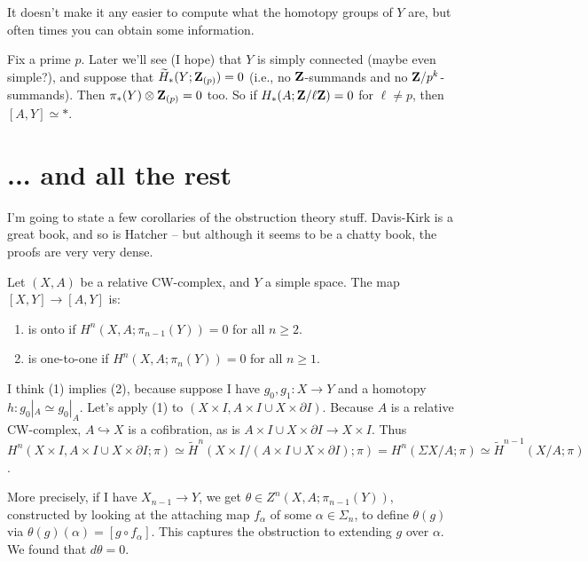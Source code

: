It doesn't make it any easier to compute what the homotopy groups of $Y$ are, but often times you can obtain some information.
\begin{remark}
    Fix a prime $p$. Later we'll see (I hope) that $Y$ is simply connected (maybe even simple?), and suppose that $\widetilde{H}_\ast(Y;\mathbf Z_{(p)}) = 0$ (i.e., no $\mathbf Z$-summands and no $\mathbf Z/p^k$-summands). Then $\pi_\ast(Y)\otimes\mathbf Z_{(p)} = 0$ too. So if $H_\ast(A;\mathbf Z/\ell\mathbf Z) = 0$ for $\ell\neq p$, then $[A,Y]\simeq \ast$.
\end{remark}
\section{... and all the rest}
I'm going to state a few corollaries of the obstruction theory stuff. Davis-Kirk is a great book, and so is Hatcher -- but although it seems to be a chatty book, the proofs are very very dense.
\begin{theorem}
    Let $(X,A)$ be a relative CW-complex, and $Y$ a simple space. The map $[X,Y]\to [A,Y]$ is:
    \begin{enumerate}
	\item is onto if $H^n(X,A;\pi_{n-1}(Y)) = 0$ for all $n\geq 2$.
	\item is one-to-one if $H^n(X,A;\pi_n(Y)) = 0$ for all $n\geq 1$.
    \end{enumerate}
\end{theorem}
I think (1) implies (2), because suppose I have $g_0,g_1:X\to Y$ and a homotopy $h:g_0|_{A}\simeq g_0|_{A}$. Let's apply (1) to $(X\times I,A\times I\cup X\times\partial I)$. Because $A$ is a relative CW-complex, $A\hookrightarrow X$ is a cofibration, as is $A\times I\cup X\times\partial I\to X\times I$. Thus $H^n(X\times I,A\times I\cup X\times\partial I;\pi)\simeq \widetilde{H}^n(X\times I/(A\times I\cup X\times\partial I);\pi) = H^n(\Sigma X/A;\pi)\simeq \widetilde{H}^{n-1}(X/A;\pi)$.

More precisely, if I have $X_{n-1}\to Y$, we get $\theta\in Z^n(X,A;\pi_{n-1}(Y))$, constructed by looking at the attaching map $f_\alpha$ of some $\alpha\in\Sigma_n$, to define $\theta(g)$ via $\theta(g)(\alpha) = [g\circ f_\alpha]$. This captures the obstruction to extending $g$ over $\alpha$. We found that $d\theta = 0$.

